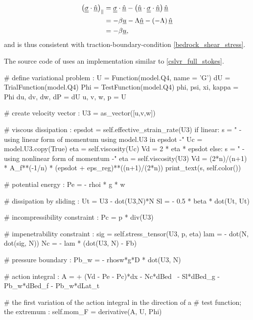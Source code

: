 \begin{align}
  \left( \underline{\underline{\sigma}} \cdot \underline{\hat{n}} \right)_{\Vert} &= \underline{\underline{\sigma}} \cdot \underline{\hat{n}} - \left( \underline{\hat{n}} \cdot \underline{\underline{\sigma}} \cdot \underline{\hat{n}}\right) \underline{\hat{n}} \notag \\
  &= - \beta \underline{u} - \Lambda \underline{\hat{n}} - \left( -\Lambda \right) \underline{\hat{n}} \notag \\
  &= - \beta \underline{u},
\end{align}
and is thus consistent with traction-boundary-condition \cref{bedrock_shear_stress}.

The source code of \CSLVR uses an implementation similar to \cref{cslvr_full_stokes}.

\begin{python}[label=cslvr_full_stokes, caption={\CSLVR source code contained in the \texttt{MomentumDukowiczStokes} class.}]
# define variational problem :
U                    = Function(model.Q4, name = 'G')
dU                   = TrialFunction(model.Q4)
Phi                  = TestFunction(model.Q4)
phi, psi, xi,  kappa = Phi
du,  dv,  dw,  dP    = dU
u,   v,   w,   p     = U

# create velocity vector :
U3      = as_vector([u,v,w])

# viscous dissipation :
epsdot  = self.effective_strain_rate(U3)
if linear:
  s   = "    - using linear form of momentum using model.U3 in epsdot -"
  Uc  = model.U3.copy(True)
  eta = self.viscosity(Uc)
  Vd  = 2 * eta * epsdot
else:
  s   = "    - using nonlinear form of momentum -"
  eta = self.viscosity(U3)
  Vd  = (2*n)/(n+1) * A_f**(-1/n) * (epsdot + eps_reg)**((n+1)/(2*n))
print_text(s, self.color())

# potential energy :
Pe     = - rhoi * g * w

# dissipation by sliding :
Ut     = U3 - dot(U3,N)*N
Sl     = - 0.5 * beta * dot(Ut, Ut)

# incompressibility constraint :
Pc     = p * div(U3)

# impenetrability constraint :
sig    = self.stress_tensor(U3, p, eta)
lam    = - dot(N, dot(sig, N))
Nc     = - lam * (dot(U3, N) - Fb)

# pressure boundary :
Pb_w   = - rhosw*g*D * dot(U3, N)

# action integral :
A      = + (Vd - Pe - Pc)*dx - Nc*dBed \
         - Sl*dBed_g - Pb_w*dBed_f - Pb_w*dLat_t

# the first variation of the action integral in the direction of a 
# test function; the extremum :
self.mom_F = derivative(A, U, Phi)


\end{python}
